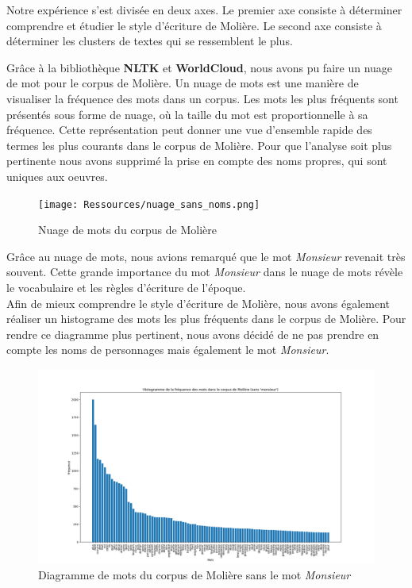 \vspace{\baselineskip}

\hspace{0,5cm}Notre expérience s'est divisée en deux axes. Le premier axe
consiste à déterminer comprendre et étudier le style d'écriture de Molière. Le
second axe consiste à déterminer les clusters de textes qui se ressemblent le
plus.

\hspace{0,5cm}Grâce à la bibliothèque \textbf{NLTK} et \textbf{WorldCloud}, nous
avons pu faire un nuage de mot pour le corpus de Molière. Un nuage de mots est
une manière de visualiser la fréquence des mots dans un corpus. Les mots
les plus fréquents sont présentés sous forme de nuage, où la taille du mot est
proportionnelle à sa fréquence. Cette représentation peut donner une vue
d'ensemble rapide des termes les plus courants dans le corpus de Molière. Pour
que l'analyse soit plus pertinente nous avons supprimé la prise en compte des
noms propres, qui sont uniques aux oeuvres.

\begin{figure}[htbp]
    \centering
    \texttt{[image: Ressources/nuage\_sans\_noms.png]}
    \caption{Nuage de mots du corpus de Molière}
    \label{fig:images}
  \end{figure}

\vspace{\baselineskip}

\hspace{0,5cm}Grâce au nuage de mots, nous avions remarqué que le mot \textit{Monsieur}
revenait très souvent. Cette grande importance du mot \textit{Monsieur} dans le
nuage de mots révèle le vocabulaire et les règles d'écriture de l'époque.
\\Afin de mieux comprendre le style d'écriture de Molière, nous avons également
réaliser un histograme des mots les plus fréquents dans le corpus de Molière.
Pour rendre ce diagramme plus pertinent, nous avons décidé de ne pas prendre en
compte les noms de personnages mais également le mot \textit{Monsieur}.

\begin{figure}[htbp]
    \centering
    \includegraphics[width=13cm]{Ressources/diagr_sans_noms_mosn.png}
    \caption{Diagramme de mots du corpus de Molière sans le mot \textit{Monsieur}}
    \label{fig:images}
  \end{figure}

  \vspace{\baselineskip}


